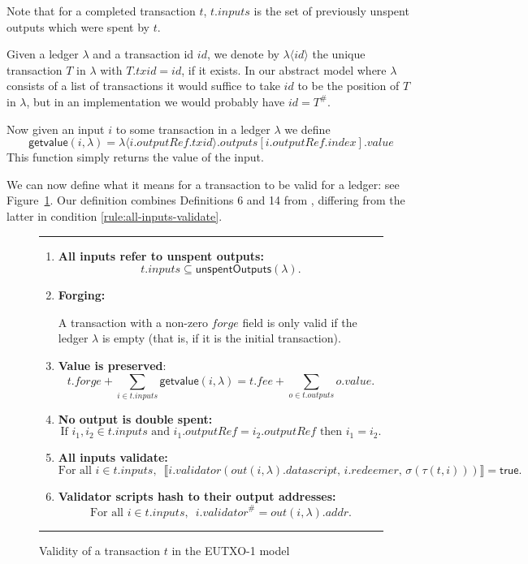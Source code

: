 \documentclass[a4paper]{article}
\theoremstyle{definition}  %
\newcommand\rfskip{7pt}
\newenvironment{ruledfigure}[1]{\begin{figure}[#1]\hrule\vspace{\rfskip}}{\vspace{\rfskip}\hrule\end{figure}}
\newcommand{\true}{\textsf{true}}
\newcommand{\mi}[1]{\ensuremath{\mathit{#1}}}
\newcommand{\txid}{\mi{txid}}
\newcommand{\idx}{\mi{index}}
\newcommand{\inputs}{\mi{inputs}}
\newcommand{\outputs}{\mi{outputs}}
\newcommand{\forge}{\mi{forge}}
\newcommand{\fee}{\mi{fee}}
\newcommand{\addr}{\mi{addr}}
\newcommand{\val}{\mi{value}}  %
\newcommand{\validator}{\mi{validator}}
\newcommand{\redeemer}{\mi{redeemer}}
\newcommand{\datascript}{\mi{datascript}}
\newcommand{\outputref}{\mi{outputRef}}
\newcommand{\txout}{\mi{out}}
\newcommand{\id}{\mi{id}}
\newcommand{\getvalue}{\msf{getvalue}}
\newcommand{\msf}[1]{\ensuremath{\mathsf{#1}}}
\newcommand{\unspent}{\msf{unspentOutputs}}
\begin{document}
\noindent Note that for a completed transaction $t$, $t.\inputs$ is
the set of previously unspent outputs which were spent by $t$.

\medskip
\noindent Given a ledger $\lambda$ and a transaction id $\id$, we
denote by $\lambda\langle\id\rangle$ the unique transaction $T$ in
$\lambda$ with $T.\txid = \id$, if it exists. In our abstract model
where $\lambda$ consists of a list of transactions it would suffice to
take $id$ to be the position of $T$ in $\lambda$, but in an
implementation we would probably have $id = T^{\#}$.

\medskip
\noindent Now given an input $i$ to some transaction in a ledger
$\lambda$ we define
$$
\getvalue(i,\lambda) = \lambda\langle i.\outputref.\txid \rangle.\outputs[i.\outputref.\idx].\val
$$
This function simply returns the value of the input.



\bigskip

\noindent We can now define what it means for a transaction to be
valid for a ledger: see Figure~\ref{fig:eutxo-1-validity}.  Our
definition combines Definitions 6 and 14 from
\citep{Zahnentferner18-UTxO}, differing from the latter in condition
\ref{rule:all-inputs-validate}.


\begin{ruledfigure}{H}
\begin{enumerate}
    \item \label{rule:all-inputs-refer-to-unspent-outputs} \textbf{All
      inputs refer to unspent outputs:}
      \[
        t.\inputs \subseteq \unspent(\lambda).
      \]
    \item\label{rule:forging} \textbf{Forging:}
      \begin{center}
        \parbox{0.8\textwidth}{ A transaction with a non-zero \forge{}
          field is only valid if the ledger $\lambda$ is empty (that
          is, if it is the initial transaction).}
    \end{center}
      
    \item \label{rule:value-is-preserved} \textbf{Value is preserved}:
    \[
      t.\forge + \sum_{i \in t.\inputs} \getvalue(i, \lambda) = t.\fee + \sum_{o \in t.\outputs} o.\val.
    \]
    \item \label{rule:no-double-spending} \textbf{No output is double spent:}
    \[
     \textrm{If } i_1, i_2 \in t.\inputs \textrm{ and }  i_1.\mathit{outputRef} = i_2.\mathit{outputRef}
     \textrm{ then } i_1 = i_2.
    \]
    \item\label{rule:all-inputs-validate} \textbf{All inputs validate:}
    \[
    \textrm{For all } i \in t.\inputs,\enspace \llbracket
    i.\validator(\txout(i, \lambda).\datascript,\, i.\redeemer,\,  \sigma(\tau(t,i))) \rrbracket = \true.
      \]
    \item\label{rule:validator-scripts-hash} \textbf{Validator scripts hash to their output addresses:}
    \[
      \textrm{For all } i \in t.\inputs,\enspace i.\validator^{\#} = \txout(i, \lambda).\addr.
    \]
\end{enumerate}
\caption{Validity of a transaction $t$ in the EUTXO-1 model}
\label{fig:eutxo-1-validity}
\end{ruledfigure}
\end{document}
